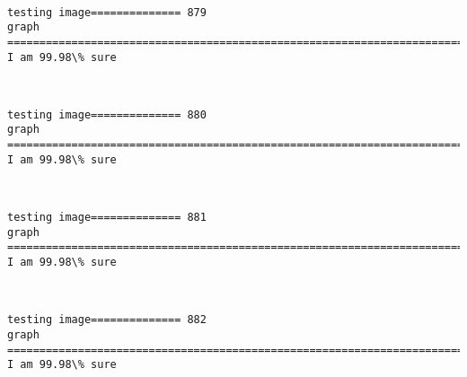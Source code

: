\documentclass[11pt]{article}
\begin{document}
    \begin{center}
    \end{center}
    { \hspace*{\fill} \\}
    
    \begin{Verbatim}[commandchars=\\\{\}]
testing image============== 879
graph
============================================================================
I am 99.98\% sure

    \end{Verbatim}

    \begin{center}
    \end{center}
    { \hspace*{\fill} \\}
    
    \begin{Verbatim}[commandchars=\\\{\}]
testing image============== 880
graph
============================================================================
I am 99.98\% sure

    \end{Verbatim}

    \begin{center}
    \end{center}
    { \hspace*{\fill} \\}
    
    \begin{Verbatim}[commandchars=\\\{\}]
testing image============== 881
graph
============================================================================
I am 99.98\% sure

    \end{Verbatim}

    \begin{center}
    \end{center}
    { \hspace*{\fill} \\}
    
    \begin{Verbatim}[commandchars=\\\{\}]
testing image============== 882
graph
============================================================================
I am 99.98\% sure

    \end{Verbatim}
\end{document}
